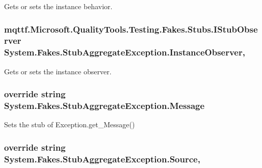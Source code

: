 Gets or sets the instance behavior.

\hypertarget{class_system_1_1_fakes_1_1_stub_aggregate_exception_a5d29f6fb7bf8fd1d77e624cbd6900bc5}{
\subsubsection[{Instance\-Observer}]{\setlength{\rightskip}{0pt plus 5cm}mqttf.\-Microsoft.\-Quality\-Tools.\-Testing.\-Fakes.\-Stubs.\-I\-Stub\-Observer System.\-Fakes.\-Stub\-Aggregate\-Exception.\-Instance\-Observer\hspace{0.3cm}{\ttfamily [get]}, {\ttfamily [set]}}}\label{class_system_1_1_fakes_1_1_stub_aggregate_exception_a5d29f6fb7bf8fd1d77e624cbd6900bc5}


Gets or sets the instance observer.

\hypertarget{class_system_1_1_fakes_1_1_stub_aggregate_exception_a5bea054e1260a42dce2499e31d06a010}{
\subsubsection[{Message}]{\setlength{\rightskip}{0pt plus 5cm}override string System.\-Fakes.\-Stub\-Aggregate\-Exception.\-Message\hspace{0.3cm}{\ttfamily [get]}}}\label{class_system_1_1_fakes_1_1_stub_aggregate_exception_a5bea054e1260a42dce2499e31d06a010}


Sets the stub of Exception.\-get\-\_\-\-Message()

\hypertarget{class_system_1_1_fakes_1_1_stub_aggregate_exception_abd6a7539a19075e0aac3415a38617bc0}{
\subsubsection[{Source}]{\setlength{\rightskip}{0pt plus 5cm}override string System.\-Fakes.\-Stub\-Aggregate\-Exception.\-Source\hspace{0.3cm}{\ttfamily [get]}, {\ttfamily [set]}}}\label{class_system_1_1_fakes_1_1_stub_aggregate_exception_abd6a7539a19075e0aac3415a38617bc0}


